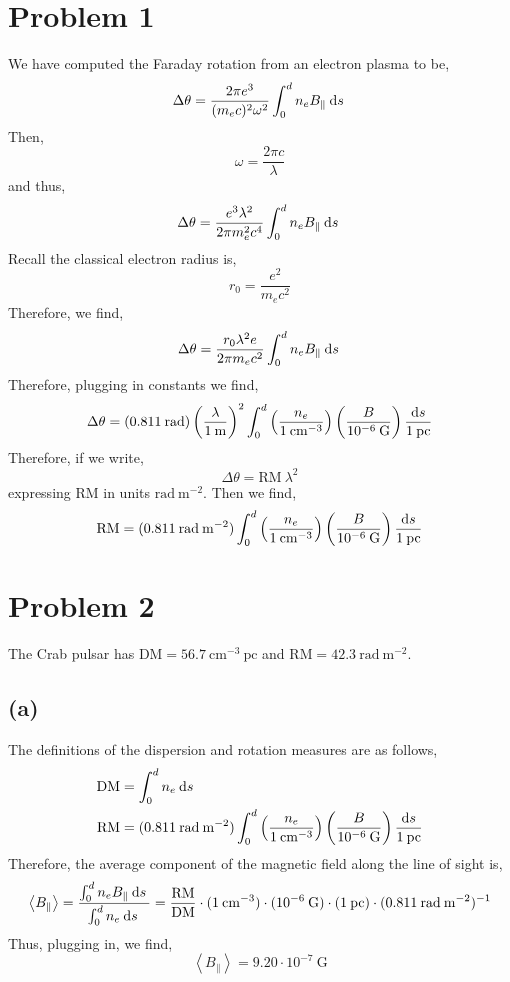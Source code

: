 \documentclass[12pt]{article}
\begin{document}

\newcommand{\DM}{\mathrm{DM}}
\newcommand{\RM}{\mathrm{RM}}
\newcommand{\cm}{\mathrm{cm}}
\newcommand{\pc}{\mathrm{pc}}

\section{Problem 1}

We have computed the Faraday rotation from an electron plasma to be,
\[ \Delta \theta = \frac{2 \pi e^3}{(m_e c)^2 \omega^2} \int_0^d n_e B_\parallel \: \mathrm{d}s \: \]
Then,
\[ \omega = \frac{2 \pi c}{\lambda} \] 
and thus,
\[ \Delta \theta = \frac{e^3 \lambda^2}{2 \pi m_e^2 c^4} \int_0^d n_e B_\parallel \: \mathrm{d}s \: \]
Recall the classical electron radius is,
\[ r_0 = \frac{e^2}{m_e c^2} \]
Therefore, we find,
\[ \Delta \theta = \frac{r_0 \lambda^2 e}{2 \pi m_e c^2} \int_0^d n_e B_\parallel \: \mathrm{d}s \: \]
Therefore, plugging in constants we find,
\[ \Delta \theta = (0.811 \: \mathrm{rad})  \left( \frac{\lambda}{1 \: \mathrm{m}} \right)^2 \int_0^d \left( \frac{n_e}{1 \: \cm^{-3}} \right) \left( \frac{B}{10^{-6} \: \mathrm{G}} \right) \frac{\d{s}}{1 \: \pc} \] 
Therefore, if we write,
\[ \Delta \theta = \RM \: \lambda^2 \]
expressing $\RM$ in units $\mathrm{rad} \: \mathrm{m}^{-2}$. Then we find,
\[ \RM = (0.811 \: \mathrm{rad} \: \mathrm{m}^{-2})  \int_0^d \left( \frac{n_e}{1 \: \cm^{-3}} \right) \left( \frac{B}{10^{-6} \: \mathrm{G}} \right) \frac{\d{s}}{1 \: \pc} \] 

\section{Problem 2}

The Crab pulsar has $\DM = 56.7 \: \cm^{-3} \: \pc$ and $\RM = 42.3 \: \mathrm{rad} \: \mathrm{m}^{-2}$.

\subsection*{(a)}

The definitions of the dispersion and rotation measures are as follows,
\begin{align*}
\DM & =  \int_0^d n_e \d{s}
\\
\RM & = (0.811 \: \mathrm{rad} \: \mathrm{m}^{-2})  \int_0^d \left( \frac{n_e}{1 \: \cm^{-3}} \right) \left( \frac{B}{10^{-6} \: \mathrm{G}} \right) \frac{\d{s}}{1 \: \pc}
\end{align*}
Therefore, the average component of the magnetic field along the line of sight is,
\begin{align*}
\left< B_\parallel \right> = \frac{\int_0^d n_e B_\parallel \d{s}}{\int_0^d n_e \d{s}} = \frac{\RM}{\DM} \cdot (1 \: \cm^{-3}) \cdot (10^{-6} \: \mathrm{G}) \cdot (1 \: \mathrm{pc}) \cdot (0.811 \: \mathrm{rad} \: \mathrm{m}^{-2}) ^{-1}
\end{align*}
Thus, plugging in, we find,
\[ \left< B_\parallel \right> = 9.20 \cdot 10^{-7} \: \mathrm{G} \]
\end{document}

